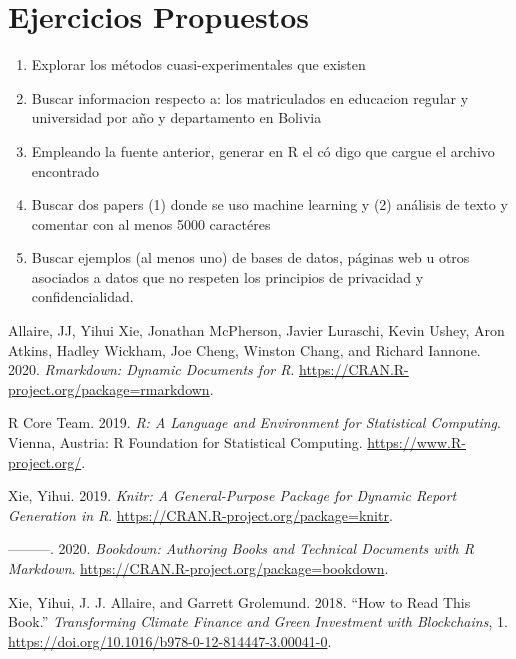 \documentclass[
]{book}
\providecommand{\tightlist}{%
  \setlength{\itemsep}{0pt}\setlength{\parskip}{0pt}}
\begin{document}
\hypertarget{ejercicios-propuestos-1}{%
\section{Ejercicios Propuestos}\label{ejercicios-propuestos-1}}

\begin{enumerate}
\def\labelenumi{\arabic{enumi}.}
\tightlist
\item
  Explorar los métodos cuasi-experimentales que existen
\item
  Buscar informacion respecto a: los matriculados en educacion regular y universidad por año y departamento en Bolivia
\item
  Empleando la fuente anterior, generar en R el có
  digo que cargue el archivo encontrado
\item
  Buscar dos papers (1) donde se uso machine learning y (2) análisis de texto y comentar con al menos 5000 caractéres
\item
  Buscar ejemplos (al menos uno) de bases de datos, páginas web u otros asociados a datos que no respeten los principios de privacidad y confidencialidad.
\end{enumerate}

\hypertarget{refs}{}
\leavevmode\hypertarget{ref-R-rmarkdown}{}%
Allaire, JJ, Yihui Xie, Jonathan McPherson, Javier Luraschi, Kevin Ushey, Aron Atkins, Hadley Wickham, Joe Cheng, Winston Chang, and Richard Iannone. 2020. \emph{Rmarkdown: Dynamic Documents for R}. \url{https://CRAN.R-project.org/package=rmarkdown}.

\leavevmode\hypertarget{ref-R-base}{}%
R Core Team. 2019. \emph{R: A Language and Environment for Statistical Computing}. Vienna, Austria: R Foundation for Statistical Computing. \url{https://www.R-project.org/}.

\leavevmode\hypertarget{ref-R-knitr}{}%
Xie, Yihui. 2019. \emph{Knitr: A General-Purpose Package for Dynamic Report Generation in R}. \url{https://CRAN.R-project.org/package=knitr}.

\leavevmode\hypertarget{ref-R-bookdown}{}%
---------. 2020. \emph{Bookdown: Authoring Books and Technical Documents with R Markdown}. \url{https://CRAN.R-project.org/package=bookdown}.

\leavevmode\hypertarget{ref-Xie2018}{}%
Xie, Yihui, J. J. Allaire, and Garrett Grolemund. 2018. ``How to Read This Book.'' \emph{Transforming Climate Finance and Green Investment with Blockchains}, 1. \url{https://doi.org/10.1016/b978-0-12-814447-3.00041-0}.
\end{document}
